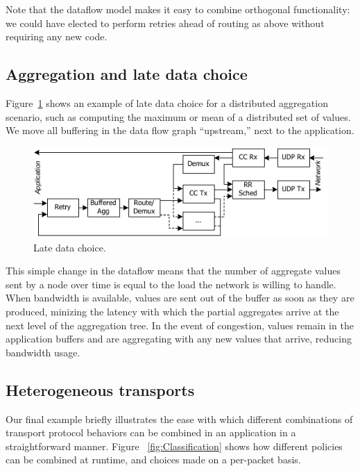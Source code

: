Note that the dataflow model makes it easy to combine orthogonal
functionality: we could have elected to perform retries ahead of
routing as above without requiring any new code. 

\subsection{Aggregation and late data choice}

Figure~\ref{fig:BufferedAggregation} shows an example of late data
choice for a distributed aggregation scenario, such as computing
the maximum or mean of a distributed set of values.  We move all
buffering in the data flow graph ``upstream,'' next to the
application. 

\begin{figure}
\centerline{\includegraphics{figures/BufferedAggregationRetries}}
\caption{Late data choice.}
\label{fig:BufferedAggregation}
\end{figure}

This simple change in the dataflow means that the number of aggregate
values sent by a node over time is equal to the load the network
is willing to handle.  When bandwidth is available, values are sent
out of the buffer as soon as they are produced, minizing the latency
with which the partial aggregates arrive at the next level of the
aggregation tree.  In the event of congestion, values remain in the
application buffers and are aggregating with any new values that
arrive, reducing bandwidth usage. 

\subsection{Heterogeneous transports}

Our final example briefly illustrates the ease with which different
combinations of transport protocol behaviors can be combined in an
application in a straightforward manner.  Figure
~\ref{fig:Classification} shows how different policies can be combined
at runtime, and choices made on a per-packet basis. 

